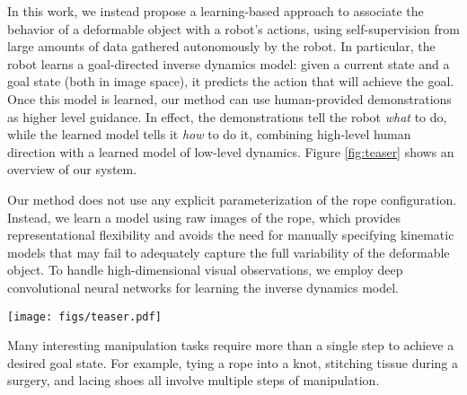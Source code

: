 \documentclass[letterpaper, 10 pt, conference]{ieeeconf}  %
\begin{document}
In this work, we instead propose a learning-based approach to associate the behavior of a deformable object with a robot's actions, using self-supervision from large amounts of data gathered autonomously by the robot. In particular, the robot learns a goal-directed inverse dynamics model: given a current state and a goal state (both in image space), it predicts the action that will achieve the goal. Once this model is learned, our method can use human-provided demonstrations as higher level guidance. In effect, the demonstrations tell the robot \emph{what} to do, while the learned model tells it \emph{how} to do it, combining high-level human direction with a learned model of low-level dynamics. Figure \ref{fig:teaser} shows an overview of our system. 

Our method does not use any explicit parameterization of the rope configuration. Instead, we learn a model using raw images of the rope, which provides representational flexibility and avoids the need for manually specifying kinematic models that may fail to adequately capture the full variability of the deformable object. To handle high-dimensional visual observations, we employ deep convolutional neural networks for learning the inverse dynamics model.

\begin{figure*}[t]%
    \centering
    \texttt{[image: figs/teaser.pdf]}
    \caption{We present a system where the robot is capable of manipulating a rope into target configurations by combining a high-level plan provided by a human with a learned low-level model of rope manipulation. A human provides the robot with a sequence of images recorded while he manipulates the rope from an initial to goal configuration. The robot uses a learned inverse dynamics model to execute actions to follow the demonstrated trajectory. The robot uses a convolutional neural network (CNN) for learning the inverse model in a self-supervised manner using 60K interactions with the rope with no human supervision. The red heatmap on each image of the robot's execution trace shows the predicted location of the \textit{pick} action and the blue arrow shows the direction of the action. This image is best seen in color.}%
    \label{fig:teaser}%
\end{figure*}


Many interesting manipulation tasks require more than a single step to achieve a desired goal state. For example, tying a rope into a knot, stitching tissue during a surgery, and lacing shoes all involve multiple steps of manipulation.
\end{document}
